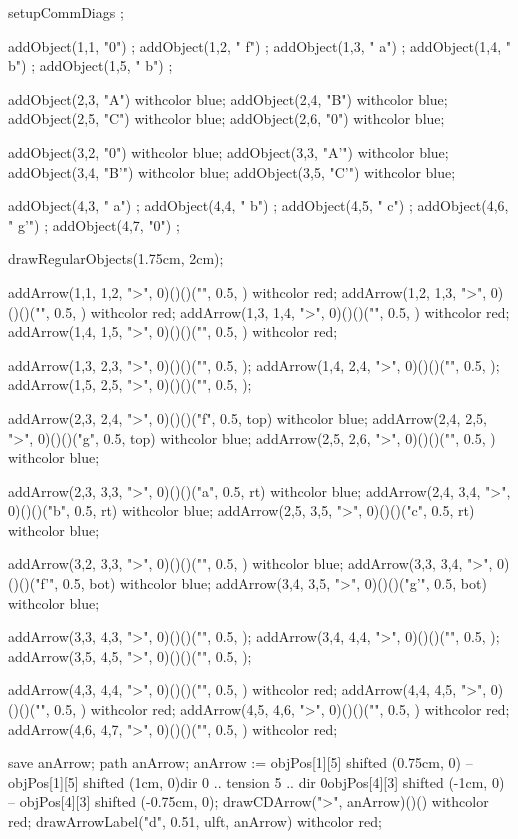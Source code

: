 \startbuffer
\startformula{}
  setupCommDiags ;
  
  addObject(1,1, "0") ;
  addObject(1,2, "\; f") ;
  addObject(1,3, "\: a") ;
  addObject(1,4, "\: b") ;
  addObject(1,5, "\: b") ;

  addObject(2,3, "A") withcolor blue;
  addObject(2,4, "B") withcolor blue;
  addObject(2,5, "C") withcolor blue;
  addObject(2,6, "0") withcolor blue;
  
  addObject(3,2, "0")  withcolor blue;
  addObject(3,3, "A'") withcolor blue;
  addObject(3,4, "B'") withcolor blue;
  addObject(3,5, "C'") withcolor blue;

  addObject(4,3, "\: a") ;
  addObject(4,4, "\: b") ;
  addObject(4,5, "\: c") ;
  addObject(4,6, "\: g'") ;
  addObject(4,7, "0") ;
    
  drawRegularObjects(1.75cm, 2cm);
  
  addArrow(1,1, 1,2, ">", 0)()()("", 0.5, ) withcolor red;
  addArrow(1,2, 1,3, ">", 0)()()("", 0.5, ) withcolor red;
  addArrow(1,3, 1,4, ">", 0)()()("", 0.5, ) withcolor red;
  addArrow(1,4, 1,5, ">", 0)()()("", 0.5, ) withcolor red;
  
  addArrow(1,3, 2,3, ">", 0)()()("", 0.5, );
  addArrow(1,4, 2,4, ">", 0)()()("", 0.5, );
  addArrow(1,5, 2,5, ">", 0)()()("", 0.5, );
  
  addArrow(2,3, 2,4, ">", 0)()()("f", 0.5, top) withcolor blue;
  addArrow(2,4, 2,5, ">", 0)()()("g", 0.5, top) withcolor blue;
  addArrow(2,5, 2,6, ">", 0)()()("", 0.5, ) withcolor blue;

  addArrow(2,3, 3,3, ">", 0)()()("a", 0.5, rt) withcolor blue;
  addArrow(2,4, 3,4, ">", 0)()()("b", 0.5, rt) withcolor blue;
  addArrow(2,5, 3,5, ">", 0)()()("c", 0.5, rt) withcolor blue;

  addArrow(3,2, 3,3, ">", 0)()()("", 0.5, ) withcolor blue;
  addArrow(3,3, 3,4, ">", 0)()()("f'", 0.5, bot) withcolor blue;
  addArrow(3,4, 3,5, ">", 0)()()("g'", 0.5, bot) withcolor blue;

  addArrow(3,3, 4,3, ">", 0)()()("", 0.5, );
  addArrow(3,4, 4,4, ">", 0)()()("", 0.5, );
  addArrow(3,5, 4,5, ">", 0)()()("", 0.5, );
  
  addArrow(4,3, 4,4, ">", 0)()()("", 0.5, ) withcolor red;
  addArrow(4,4, 4,5, ">", 0)()()("", 0.5, ) withcolor red;
  addArrow(4,5, 4,6, ">", 0)()()("", 0.5, ) withcolor red;
  addArrow(4,6, 4,7, ">", 0)()()("", 0.5, ) withcolor red;
 
  save anArrow; path anArrow;
  anArrow := 
    objPos[1][5] shifted (0.75cm, 0) --
    objPos[1][5] shifted (1cm, 0){dir 0} ..
    tension 5 ..
    {dir 0}objPos[4][3] shifted (-1cm, 0) -- 
    objPos[4][3] shifted (-0.75cm, 0);
  drawCDArrow(">", anArrow)()() withcolor red;
  drawArrowLabel("d", 0.51, ulft, anArrow) withcolor red;

\stopMPcode\stopformula
\stopbuffer

\processTEXbuffer

\typebuffer

\stopchapter 
